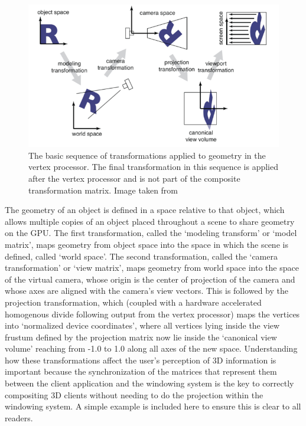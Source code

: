 \begin{figure}[ht!]
\centering
\includegraphics[width=1.0\textwidth]{images/vertex-transformation.png}
\caption{The basic sequence of transformations applied to geometry in the vertex processor. The final transformation in this sequence is applied after the vertex processor and is not part of the composite transformation matrix. Image taken from  \protect\cite{transform-image-ref}}
\label{vertex-transformation}
\end{figure}


The geometry of an object is defined in a space relative to that object, which allows multiple copies of an object placed throughout a scene to share geometry on the GPU. The first transformation, called the ‘modeling transform’ or ‘model matrix’, maps geometry from object space into the space in which the scene is defined, called ‘world space’. The second transformation, called the ‘camera transformation’  or ‘view matrix’, maps geometry from world space into the space of the virtual camera, whose origin is the center of projection of the camera and whose axes are aligned with the camera’s view vectors. This is followed by the projection transformation, which (coupled with a hardware accelerated homogenous divide following output from the vertex processor) maps the vertices into ‘normalized device coordinates’, where all vertices lying inside the view frustum defined by the projection matrix now lie inside the ‘canonical view volume’ reaching from -1.0 to 1.0 along all axes of the new space.
Understanding how these transformations affect the user’s perception of 3D information is important because the synchronization of the matrices that represent them between the client application and the windowing system is the key to correctly compositing 3D clients without needing to do the projection within the windowing system. A simple example is included here to ensure this is clear to all readers.

